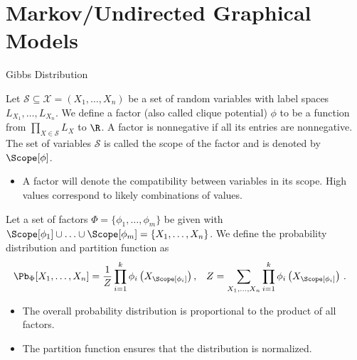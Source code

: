 \section{Markov/Undirected Graphical Models}

\begin{frame}{Gibbs Distribution}
\begin{definition}
    Let $\mathcal{S} \subseteq \mathcal{X} = (X_1,\ldots,X_n)$ be a set of random variables with label spaces $L_{X_1},\ldots,L_{X_n}$.
    We define a factor (also called clique potential) $\phi$ to be a function from $\prod_{X \in \mathcal{S}} L_{X}$ to $\R$.
    A factor is nonnegative if all its entries are nonnegative.
    The set of variables $\mathcal{S}$ is called the scope of the factor and is denoted by $\Scope[\phi]$.
\end{definition}
\begin{itemize}
    \pause \item A factor will denote the compatibility between variables in its scope. High values correspond to likely combinations of values.
\end{itemize}
\pause
\begin{definition}
   Let a set of factors $\Phi = \{\phi_1,\ldots,\phi_m\}$ be given with $\Scope[\phi_1] \cup \ldots \cup \Scope[\phi_m] = \{X_1,\ldots,X_n\}$.
   We define the probability distribution and partition function as
   \begin{align}
    \Pb_{\Phi}[X_1,\ldots, X_n] & = \frac{1}{Z} \prod_{i=1}^k \phi_i\left(X_{\Scope[\phi_i]}\right),
&
    Z & = \sum_{X_1,\ldots,X_n} \prod_{i=1}^k \phi_i\left(X_{\Scope[\phi_i]}\right)\,.
   \end{align}
\end{definition}
\begin{itemize}
    \pause \item The overall probability distribution is proportional to the product of all factors.
    \pause \item The partition function ensures that the distribution is normalized.
\end{itemize}
\end{frame}

